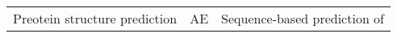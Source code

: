 \begin{center}
\begin{tabular}{l c c}
    Preotein structure prediction & AE & Sequence-based prediction of 
\end{tabular}
\end{center}